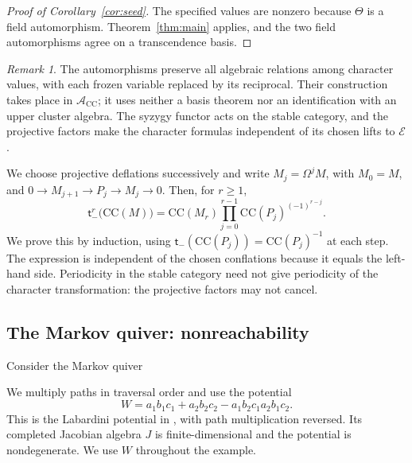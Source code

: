 \documentclass[11pt]{amsart}
\numberwithin{equation}{section}
\theoremstyle{definition}
\theoremstyle{remark}
\newtheorem{remark}[theorem]{Remark}
\newcommand{\E}{\mathcal E}
\newcommand{\CC}{\mathrm{CC}}
\begin{document}
\begin{proof}[Proof of Corollary~\ref{cor:seed}]
The specified values are nonzero because $\Theta$ is a field automorphism. Theorem~\ref{thm:main} applies, and the two field
automorphisms agree on a transcendence basis.
\end{proof}

\begin{remark}\label{rem:scope}
The automorphisms preserve all algebraic relations among character values,
with each frozen variable replaced by its reciprocal. Their construction takes place in
$\mathscr A_\CC$; it uses neither a basis theorem nor an identification
with an upper cluster algebra. The syzygy functor acts on the stable
category, and the projective factors make the character formulas
independent of its chosen lifts to $\E$.
\end{remark}
We choose projective deflations
successively and write $M_j=\Omega^j M$, with $M_0=M$, and
$0\to M_{j+1}\to P_j\to M_j\to0$. Then, for $r\geq1$,
\[ \mathsf t_-^r\bigl(\CC(M)\bigr) =\CC(M_r)\prod_{j=0}^{r-1}\CC(P_j)^{(-1)^{r-j}}. \]
We prove this by induction, using
$\mathsf t_-(\CC(P_j))=\CC(P_j)^{-1}$ at each step.
The expression is independent of the chosen conflations because it
equals the left-hand side. Periodicity in the stable category need not
give periodicity of the character transformation: the projective factors
may not cancel.

\subsection{The Markov quiver: nonreachability}\label{subsec:markov-setup}
Consider the Markov quiver 
\begin{center}
\end{center}
We multiply paths in traversal order and use the potential
\begin{equation}\label{eq:markov-potential} W=a_1b_1c_1+a_2b_2c_2-a_1b_2c_1a_2b_1c_2.\end{equation}
This is the Labardini potential in \cite[Example~4.3]{Pla13}, with path
multiplication reversed. Its completed Jacobian algebra $J$ is finite-dimensional and the potential
is nondegenerate. We use $W$ throughout the example.
\end{document}
